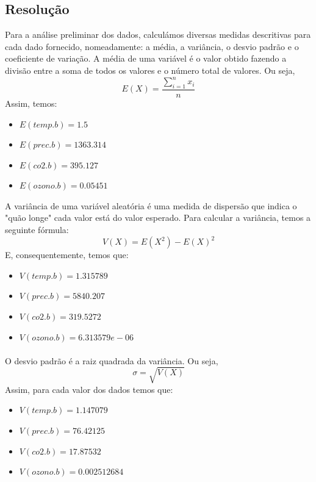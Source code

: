 \documentclass{article}
\begin{document}
			\subsection*{Resolução}
				Para a análise preliminar dos dados, calculámos diversas medidas descritivas para cada dado fornecido, nomeadamente: a média, a variância, o desvio padrão e o coeficiente de variação.
				A média de uma variável é o valor obtido fazendo a divisão entre a soma de todos os valores e o número total de valores. Ou seja,
		\begin{equation*}
			E(X) = \frac {\sum_{i=1}^{n} x_{i}}{n}
		\end{equation*}
		 Assim, temos:
		\begin{itemize}
			\item $E(temp.b) = 1.5$
			\item $E(prec.b) = 1363.314$
			\item $E(co2.b) = 395.127$
			\item $E(ozono.b) = 0.05451$
		\end{itemize}
		
		A variância de uma variável aleatória é uma medida de dispersão que indica o "quão longe" cada valor está do valor esperado. Para calcular a variância, temos a seguinte fórmula:
		\begin{equation*}
			V(X) = E(X^2) - E(X)^2
		\end{equation*}
		E, consequentemente, temos que:
		\begin{itemize}
			\item $V(temp.b) = 1.315789$
			\item $V(prec.b) = 5840.207$
			\item $V(co2.b) = 319.5272$
			\item $V(ozono.b) = 6.313579e-06$
		\end{itemize}
		
		\paragraph{}

		O desvio padrão é a raiz quadrada da variância. Ou seja, 
		\begin{equation*}
			\sigma = \sqrt{V(X)}
		\end{equation*}
		Assim, para cada valor dos dados temos que:
		\begin{itemize}
			\item $V(temp.b) = 1.147079$
			\item $V(prec.b) = 76.42125$
			\item $V(co2.b) = 17.87532$
			\item $V(ozono.b) = 0.002512684$
		\end{itemize}
		
\end{document}
